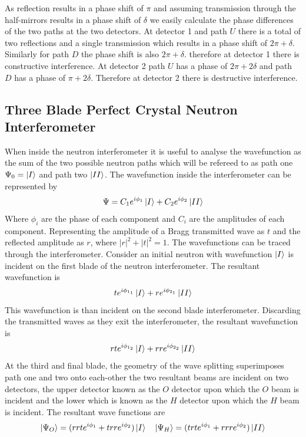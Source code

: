 As reflection results in a phase shift of $\pi$ and assuming transmission through the half-mirrors results in a phase shift of $\delta$ we easily calculate the phase differences of the two paths at the two detectors. At detector 1 and path $U$ there is a total of two reflections and a single transmission which results in a phase shift of $2\pi+\delta$. Similarly for path $D$ the phase shift is also $2\pi + \delta$. therefore at detector 1 there is constructive interference. At detector 2 path $U$ has a phase of $2\pi + 2\delta$ and path $D$ has a phase of $\pi + 2\delta$. Therefore at detector 2 there is destructive interference.\cite{dimaThesis}

\subsection{Three Blade Perfect Crystal Neutron Interferometer}
When inside the neutron interferometer it is useful to analyse the wavefunction as the sum of the two possible neutron paths which will be refereed to as path one $\Psi_0 = \Ket{I}$ and path two $\Ket{II}$. The wavefunction inside the interferometer can be represented by\cite{dimaThesis} 
\begin{equation*}
\Psi = C_1e^{i\phi_1}\Ket{I} + C_2e^{i\phi_2}\Ket{II}
\end{equation*}
Where $\phi_i$ are the phase of each component and $C_i$ are the amplitudes of each component. Representing the amplitude of a Bragg transmitted wave as $t$ and the reflected amplitude as $r$, where $|r|^2+|t|^2 = 1$. The wavefunctions can be traced through the interferometer. Consider an initial neutron with wavefunction $\Ket{I}$ is incident on the first blade of the neutron interferometer. The resultant wavefunction is 
$$ te^{i\phi_{1_1}}\Ket{I} + re^{i\phi_{2_1}}\Ket{II}$$
This wavefunction is than incident on the second blade interferometer. Discarding the transmitted waves as they exit the interferometer, the resultant wavefunction is 
$$rte^{i\phi_{1_2}}\Ket{I} + rre^{i\phi_{2_2}}\Ket{II}$$
At the third and final blade, the geometry of the wave splitting superimposes path one and two onto each-other the two resultant beams are incident on two detectors, the upper detector known as the $O$ detector upon which the $O$ beam is incident and the lower which is known as the $H$ detector upon which the $H$ beam is incident. The resultant wave functions are 
\begin{equation}
\Ket{\Psi_O} = (rrte^{i\phi_1}+trre^{i\phi_2}) \Ket{I} \,\,\,\,\,\, \Ket{\Psi_H} = (trte^{i\phi_1}+rrre^{i\phi_2})\Ket{II}
\label{eq:beams}
\end{equation}
